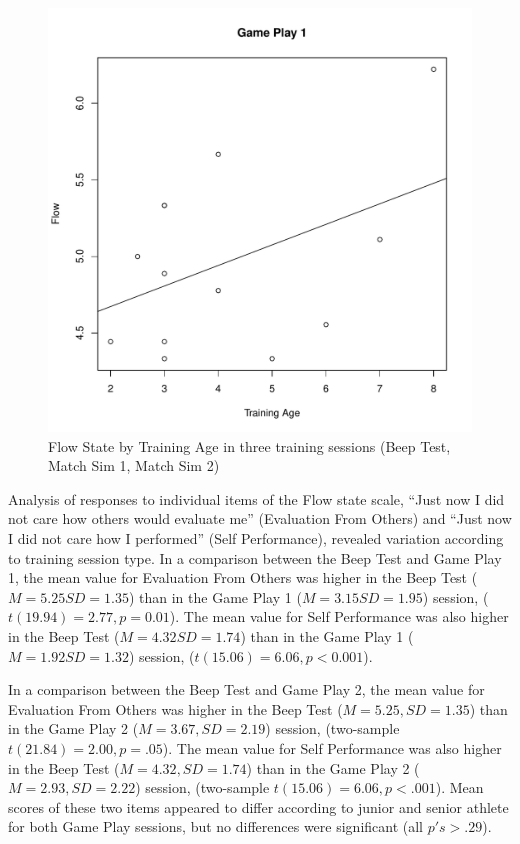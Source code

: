 \begin{CJK}{UTF8}{gbsn}
\begin{figure}[htbp]
\includegraphics[scale=.2]{images/flow0109TrainingAge.pdf}
  \caption{Flow State by Training Age in three training sessions (Beep Test, Match Sim 1, Match Sim 2)}
  \label{fig:flowTrainingAge}
\end{figure}

Analysis of responses to individual items of the Flow state scale, ``Just now I did not care how others would evaluate me'' (Evaluation From Others) and ``Just now I did not care how I performed'' (Self Performance), revealed variation according to training session type.  In a comparison between the Beep Test and Game Play 1, the mean value for Evaluation From Others was higher in the Beep Test ($M = 5.25 SD = 1.35$) than in the Game Play 1 ($M = 3.15 SD = 1.95$) session, ($t(19.94) = 2.77, p = 0.01$).  The mean value for Self Performance was also higher in the Beep Test ($M = 4.32 SD = 1.74$) than in the Game Play 1 ($M = 1.92 SD = 1.32$) session, ($t(15.06) = 6.06, p < 0.001$).

In a comparison between the Beep Test and Game Play 2, the mean value for Evaluation From Others was higher in the Beep Test ($M = 5.25, SD = 1.35$) than in the Game Play 2 ($M = 3.67, SD = 2.19$) session, (two-sample $t(21.84) = 2.00, p = .05$).   The mean value for Self Performance was also higher in the Beep Test ($M = 4.32, SD = 1.74$) than in the Game Play 2 ($M = 2.93, SD = 2.22$) session, (two-sample $t(15.06) = 6.06, p < .001$).  Mean scores of these two items appeared to differ according to junior and senior athlete for both Game Play sessions, but no differences were significant (all $p's > .29$).


\end{CJK}

